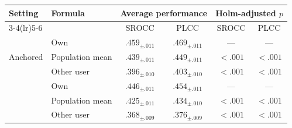 \begin{tabular}{ll cc cc}
\toprule
Setting & Formula & \multicolumn{2}{c}{Average performance} & \multicolumn{2}{c}{Holm-adjusted $p$} \\
\cmidrule(lr){3-4}\cmidrule(lr){5-6}
& & SROCC & PLCC & SROCC & PLCC \\
\midrule
\multirow{3}{*}{Anchored} & Own & $\bm{.459_{\pm .011}}$ & $\bm{.469_{\pm .011}}$ & --- & --- \\
& Population mean & $.439_{\pm .011}$ & $.449_{\pm .011}$ & $<.001$ & $<.001$ \\
& Other user & $.396_{\pm .010}$ & $.403_{\pm .010}$ & $<.001$ & $<.001$ \\
\addlinespace
\multirow{3}{*}{Unanchored} & Own & $\bm{.446_{\pm .011}}$ & $\bm{.454_{\pm .011}}$ & --- & --- \\
& Population mean & $.425_{\pm .011}$ & $.434_{\pm .010}$ & $<.001$ & $<.001$ \\
& Other user & $.368_{\pm .009}$ & $.376_{\pm .009}$ & $<.001$ & $<.001$ \\
\bottomrule
\end{tabular}

